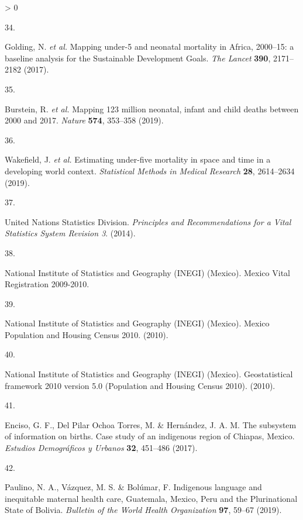 \documentclass[
]{article}
\newlength{\cslhangindent}
\newlength{\csllabelwidth}
\newenvironment{CSLReferences}[2] %
 {%
  \setlength{\parindent}{0pt}
  \ifodd #1 \everypar{\setlength{\hangindent}{\cslhangindent}}\ignorespaces\fi
  \ifnum #2 > 0
  \setlength{\parskip}{#2\baselineskip}
  \fi
 }%
 {}
\newcommand{\CSLLeftMargin}[1]{\parbox[t]{\csllabelwidth}{#1}}
\newcommand{\CSLRightInline}[1]{\parbox[t]{\linewidth - \csllabelwidth}{#1}\break}
\begin{document}
\begin{CSLReferences}{0}{0}
\leavevmode\hypertarget{ref-Golding2017}{}%
\CSLLeftMargin{34. }
\CSLRightInline{Golding, N. \emph{et al.} {Mapping under-5 and neonatal mortality in Africa, 2000--15: a baseline analysis for the Sustainable Development Goals}. \emph{The Lancet} \textbf{390}, 2171--2182 (2017).}

\leavevmode\hypertarget{ref-Burstein2019}{}%
\CSLLeftMargin{35. }
\CSLRightInline{Burstein, R. \emph{et al.} {Mapping 123 million neonatal, infant and child deaths between 2000 and 2017}. \emph{Nature} \textbf{574}, 353--358 (2019).}

\leavevmode\hypertarget{ref-Wakefield2019}{}%
\CSLLeftMargin{36. }
\CSLRightInline{Wakefield, J. \emph{et al.} {Estimating under-five mortality in space and time in a developing world context}. \emph{Statistical Methods in Medical Research} \textbf{28}, 2614--2634 (2019).}

\leavevmode\hypertarget{ref-UnitedNationsStatisticsDivision2014}{}%
\CSLLeftMargin{37. }
\CSLRightInline{United Nations Statistics Division. \emph{{Principles and Recommendations for a Vital Statistics System Revision 3}}. (2014).}

\leavevmode\hypertarget{ref-INEGI2010}{}%
\CSLLeftMargin{38. }
\CSLRightInline{National Institute of Statistics and Geography (INEGI) (Mexico). {Mexico Vital Registration 2009-2010}.}

\leavevmode\hypertarget{ref-INEGI2010a}{}%
\CSLLeftMargin{39. }
\CSLRightInline{National Institute of Statistics and Geography (INEGI) (Mexico). {Mexico Population and Housing Census 2010}. (2010).}

\leavevmode\hypertarget{ref-INEGI2010b}{}%
\CSLLeftMargin{40. }
\CSLRightInline{National Institute of Statistics and Geography (INEGI) (Mexico). {Geostatistical framework 2010 version 5.0 (Population and Housing Census 2010)}. (2010).}

\leavevmode\hypertarget{ref-Enciso2017}{}%
\CSLLeftMargin{41. }
\CSLRightInline{Enciso, G. F., Del Pilar Ochoa Torres, M. \& Hernández, J. A. M. {The subsystem of information on births. Case study of an indigenous region of Chiapas, Mexico}. \emph{Estudios Demogr{á}ficos y Urbanos} \textbf{32}, 451--486 (2017).}

\leavevmode\hypertarget{ref-Paulino2019}{}%
\CSLLeftMargin{42. }
\CSLRightInline{Paulino, N. A., Vázquez, M. S. \& Bolúmar, F. {Indigenous language and inequitable maternal health care, Guatemala, Mexico, Peru and the Plurinational State of Bolivia}. \emph{Bulletin of the World Health Organization} \textbf{97}, 59--67 (2019).}


\end{CSLReferences}
\end{document}
